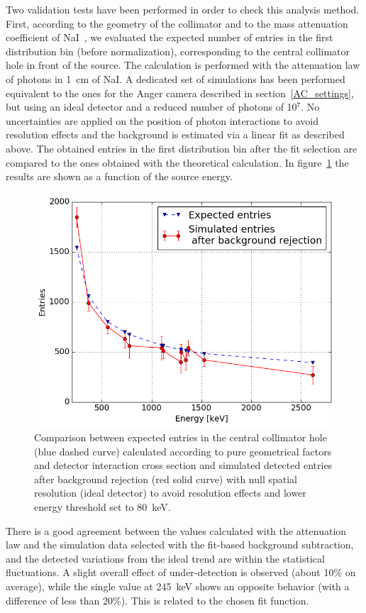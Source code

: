 Two validation tests have been performed in order to check this analysis method. 
First, according to the geometry of the collimator and to the mass attenuation coefficient of NaI~\cite{tabNIST}, we evaluated the expected number of entries in the first distribution bin (before normalization), corresponding to the central collimator hole in front of the source. The calculation is performed with the attenuation law of photons in 1~cm of NaI. A dedicated set of simulations has been performed equivalent to the ones for the Anger camera described in section~\ref{AC_settings}, but using an ideal detector and a reduced number of photons of 10$^7$. No uncertainties are applied on the position of photon interactions to avoid resolution effects and the background is estimated via a linear fit as described above. The obtained entries in the first distribution bin after the fit selection are compared to the ones obtained with the theoretical calculation. In figure~\ref{fig:firstBinCheck} the results are shown as a function of the source energy.


\begin{figure}[h]
  \centering
  \includegraphics[width=.5\textwidth]{03_GraphicFiles/chapter4/SPECT/anger/firstBinInVSenergy}
\caption{Comparison between expected entries in the central collimator hole (blue dashed curve) calculated according to pure geometrical factors and detector interaction cross section and simulated detected entries after background rejection (red solid curve) with null spatial resolution (ideal detector) to avoid resolution effects and lower energy threshold set to 80~keV.}
\label{fig:firstBinCheck}
\end{figure}

There is a good agreement between the values calculated with the attenuation law and the simulation data selected with the fit-based background subtraction, and the detected variations from the ideal trend are within the statistical fluctuations. A slight overall effect of under-detection is observed (about 10\% on average), while the single value at 245~keV shows an opposite behavior (with a difference of less than 20\%). This is related to the chosen fit function.

